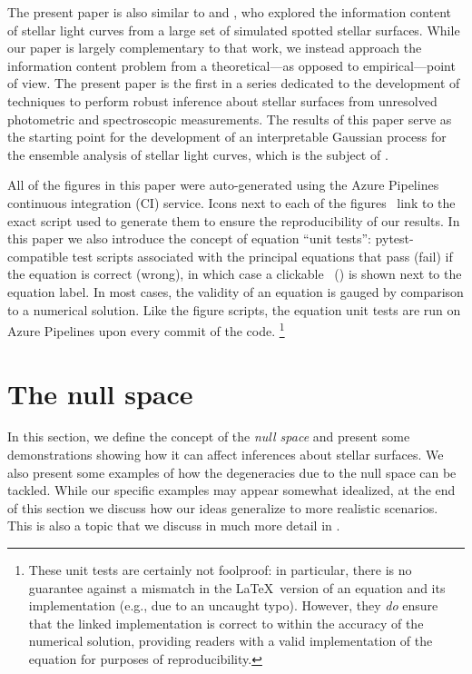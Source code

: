 \documentclass[modern]{aastex62}
\begin{document}
The present paper is also similar to \citet{Walkowicz2013} and
\citet{Basri2020}, who explored the information content of
stellar light curves from a large set of simulated spotted stellar
surfaces. While our paper is largely complementary to
that work, we instead approach the information content problem from
a theoretical---as opposed to empirical---point of view.
%
The present paper is the first in a series dedicated to the development of
techniques to perform robust inference about stellar surfaces from
unresolved photometric and spectroscopic measurements. The results
of this paper serve as the starting point for the development of
an interpretable Gaussian process for the ensemble analysis of
stellar light curves, which is the subject of
.

\vspace{1em}

All of the figures in this paper were auto-generated
using the Azure Pipelines continuous integration (CI) service.
Icons next to each of the figures \codeicon \,
link to the exact script used to generate them to ensure the reproducibility
of our results. In this paper we also introduce the concept of equation
``unit tests'': \textsf{pytest}-compatible test scripts associated
with the principal equations that pass (fail) if the equation is correct (wrong),
in which case a clickable \testpassicon \, (\testfailicon) is shown next to the equation
label.
In most cases, the validity of an equation is gauged by comparison to
a numerical solution. Like the figure scripts, the equation unit tests are
run on Azure Pipelines upon every commit of the code.%
\footnote{
    These unit tests are certainly not foolproof: in particular, there is
    no guarantee against a mismatch in the \LaTeX \, version of an equation
    and its \Python implementation (e.g., due to an uncaught typo). However, they
    \emph{do} ensure that the linked \Python implementation is correct to
    within the accuracy of the numerical solution, providing readers with a
    valid implementation of the equation for purposes of reproducibility.
}

\section{The null space}
\label{sec:nullspace}

In this section, we define the concept of the \emph{null space}
and present some demonstrations showing how it can affect inferences
about stellar surfaces.
We also present some examples of how the degeneracies due to
the null space can be tackled.
While our specific examples may appear somewhat idealized, at the end
of this section we discuss how our ideas generalize to more
realistic scenarios.
This is also a topic that we discuss in much more detail in .
\end{document}

